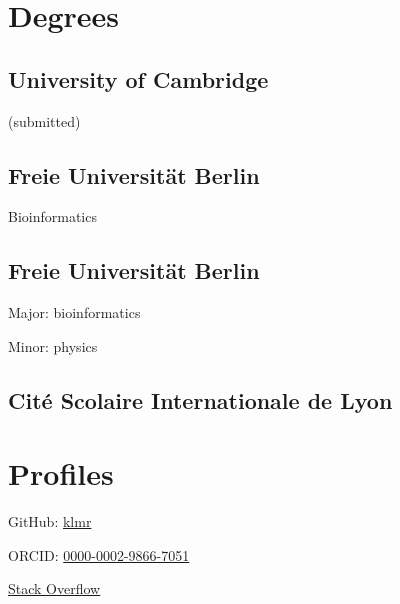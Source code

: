 \documentclass{klmr-cv}
\author{Konrad Rudolph}
\begin{document}
\maketitle

\sidebar

\section{Degrees}

\subsection{University of Cambridge}

\date{2011--now}
\item{ (submitted)}

\subsection{Freie Universität Berlin}

\date{2011}
\item{}
\item{Bioinformatics}

\subsection{Freie Universität Berlin}

\date{2008}
\item{}
\item{Major: bioinformatics}
\item{Minor: physics}

\subsection{\textfrench{Cité Scolaire Internationale de Lyon}}

\date{2003}
\item{}

\section{Profiles}

\item{GitHub: \href{http://github.com/klmr}{klmr}}
\item{ORCID: \href{http://orcid.org/0000-0002-9866-7051}{0000-0002-9866-7051}}
\item{\href{http://stackoverflow.com/users/1968/konrad-rudolph}{Stack Overflow}}
\end{document}
